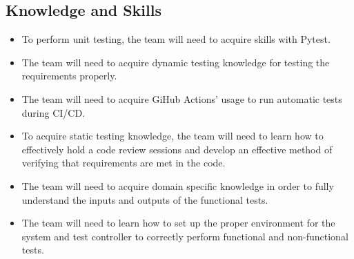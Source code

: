 \documentclass[12pt, titlepage]{article}
\begin{document}
\subsection*{Knowledge and Skills}
\begin{itemize}
    \item To perform unit testing, the team will need to acquire skills with Pytest.
    \item The team will need to acquire dynamic testing knowledge for testing the requirements properly.
    \item The team will need to acquire GiHub Actions' usage to run automatic tests during CI/CD.
    \item To acquire static testing knowledge, the team will need to learn how to effectively hold a code review sessions and develop an effective method of verifying that requirements are met in the code.
    \item The team will need to acquire domain specific knowledge in order to fully understand the inputs and outputs of the functional tests.
    \item The team will need to learn how to set up the proper environment for the system and test controller to correctly perform functional and non-functional tests.

\end{itemize}
\end{document}
